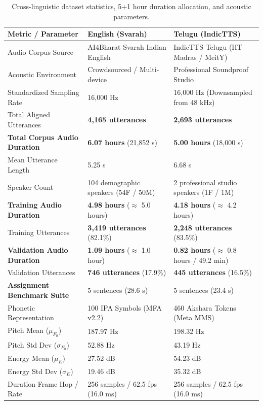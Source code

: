 \documentclass[11pt,a4paper]{article}
\begin{document}
\begin{table}[H]
\centering
\caption{Cross-linguistic dataset statistics, 5+1 hour duration allocation, and acoustic parameters.}
\label{tab:dataset_stats}
\small
\begin{tabularx}{\textwidth}{lXX}
\toprule
\textbf{Metric / Parameter} & \textbf{English (Svarah)} & \textbf{Telugu (IndicTTS)} \\
\midrule
Audio Corpus Source & AI4Bharat Svarah Indian English & IndicTTS Telugu (IIT Madras / MeitY) \\
Acoustic Environment & Crowdsourced / Multi-device & Professional Soundproof Studio \\
Standardized Sampling Rate & 16,000 Hz & 16,000 Hz (Downsampled from 48 kHz) \\
Total Aligned Utterances & \textbf{4,165 utterances} & \textbf{2,693 utterances} \\
\textbf{Total Corpus Audio Duration} & \textbf{6.07 hours} (21,852 s) & \textbf{5.00 hours} (18,000 s) \\
Mean Utterance Length & 5.25 s & 6.68 s \\
Speaker Count & 104 demographic speakers (54F / 50M) & 2 professional studio speakers (1F / 1M) \\
\midrule
\textbf{Training Audio Duration} & \textbf{4.98 hours} ($\approx$ 5.0 hours) & \textbf{4.18 hours} ($\approx$ 4.2 hours) \\
Training Utterances & \textbf{3,419 utterances} (82.1\%) & \textbf{2,248 utterances} (83.5\%) \\
\midrule
\textbf{Validation Audio Duration} & \textbf{1.09 hours} ($\approx$ 1.0 hour) & \textbf{0.82 hours} ($\approx$ 0.8 hours / 49.2 min) \\
Validation Utterances & \textbf{746 utterances} (17.9\%) & \textbf{445 utterances} (16.5\%) \\
\midrule
\textbf{Assignment Benchmark Suite} & 5 sentences (28.6 s) & 5 sentences (23.4 s) \\
Phonetic Representation & 100 IPA Symbols (MFA v2.2) & 460 Akshara Tokens (Meta MMS) \\
Pitch Mean ($\mu_{F_0}$) & 187.97 Hz & 198.32 Hz \\
Pitch Std Dev ($\sigma_{F_0}$) & 52.88 Hz & 43.19 Hz \\
Energy Mean ($\mu_E$) & 27.52 dB & 54.23 dB \\
Energy Std Dev ($\sigma_E$) & 19.46 dB & 35.32 dB \\
Duration Frame Hop / Rate & 256 samples / 62.5 fps (16.0 ms) & 256 samples / 62.5 fps (16.0 ms) \\
\bottomrule
\end{tabularx}
\end{table}
\end{document}

